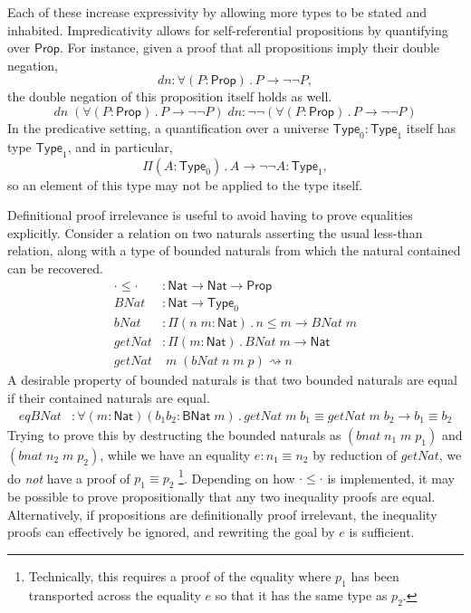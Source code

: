 \documentclass{article}
\newcommand{\kw}[1]{\mathsf{#1}}
\begin{document}
Each of these increase expressivity by allowing more types to be stated and inhabited.
Impredicativity allows for self-referential propositions by quantifying over $\kw{Prop}$.
For instance, given a proof that all propositions imply their double negation,
$$\mathit{dn}: \forall (P : \kw{Prop})\mathpunct{.} P \to \neg \neg P,$$
the double negation of this proposition itself holds as well.
$$\mathit{dn} \; (\forall (P : \kw{Prop})\mathpunct{.} P \to \neg \neg P) \; \mathit{dn} : \neg \neg (\forall (P : \kw{Prop})\mathpunct{.} P \to \neg \neg P)$$
In the predicative setting, a quantification over a universe $\kw{Type}_0 : \kw{Type}_1$
itself has type $\kw{Type}_1$, and in particular,
$$\Pi (A : \kw{Type}_0)\mathpunct{.} A \to \neg \neg A : \kw{Type}_1,$$
so an element of this type may not be applied to the type itself.

Definitional proof irrelevance is useful to avoid having to prove equalities explicitly.
Consider a relation on two naturals asserting the usual less-than relation,
along with a type of bounded naturals from which the natural contained can be recovered.
%
\begin{align*}
  \cdot \le \cdot &: \kw{Nat} \to \kw{Nat} \to \kw{Prop} \\
  \mathit{BNat} &: \kw{Nat} \to \kw{Type}_0 \\
  \mathit{bNat} &: \Pi (n \; m : \kw{Nat})\mathpunct{.} n \le m \to \mathit{BNat} \; m \\
  \mathit{getNat} &: \Pi (m : \kw{Nat})\mathpunct{.} \mathit{BNat} \; m \to \kw{Nat} \\
  \mathit{getNat} &\; m \; (\mathit{bNat} \; n \; m \; p) \rightsquigarrow n
\end{align*}
%
A desirable property of bounded naturals is that
two bounded naturals are equal if their contained naturals are equal.
%
\begin{align*}
  \mathit{eqBNat} &: \forall (m : \kw{Nat}) (b_1 b_2 : \kw{BNat} \; m)\mathpunct{.}
    \mathit{getNat} \; m \; b_1 \equiv \mathit{getNat} \; m \; b_2 \to b_1 \equiv b_2
\end{align*}
%
Trying to prove this by destructing the bounded naturals as
$(\mathit{bnat} \; n_1 \; m \; p_1)$ and $(\mathit{bnat} \; n_2 \; m \; p_2)$,
while we have an equality $e : n_1 \equiv n_2$ by reduction of $\mathit{getNat}$,
we do \emph{not} have a proof of $p_1 \equiv p_2$%
\footnote{Technically, this requires a proof of the equality
where $p_1$ has been transported across the equality $e$
so that it has the same type as $p_2$.}.
Depending on how $\cdot \le \cdot$ is implemented,
it may be possible to prove propositionally that any two inequality proofs are equal.
Alternatively, if propositions are definitionally proof irrelevant,
the inequality proofs can effectively be ignored,
and rewriting the goal by $e$ is sufficient.
\end{document}
